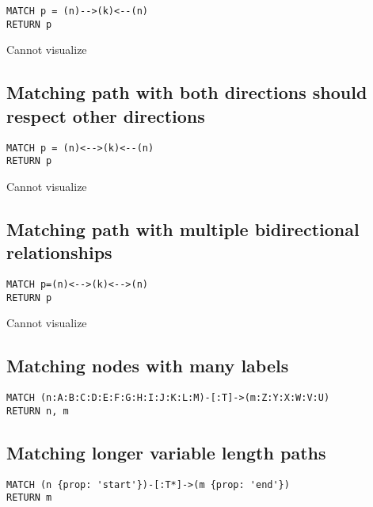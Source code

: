 \begin{lstlisting}
MATCH p = (n)-->(k)<--(n)
RETURN p
\end{lstlisting}

Cannot visualize
\subsection{Matching path with both directions should respect other directions}

\begin{lstlisting}
MATCH p = (n)<-->(k)<--(n)
RETURN p
\end{lstlisting}

Cannot visualize
\subsection{Matching path with multiple bidirectional relationships}

\begin{lstlisting}
MATCH p=(n)<-->(k)<-->(n)
RETURN p
\end{lstlisting}

Cannot visualize
\subsection{Matching nodes with many labels}

\begin{lstlisting}
MATCH (n:A:B:C:D:E:F:G:H:I:J:K:L:M)-[:T]->(m:Z:Y:X:W:V:U)
RETURN n, m
\end{lstlisting}

\subsection{Matching longer variable length paths}

\begin{lstlisting}
MATCH (n {prop: 'start'})-[:T*]->(m {prop: 'end'})
RETURN m
\end{lstlisting}

